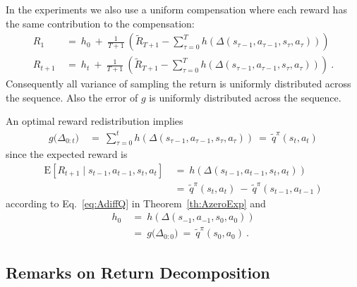 \documentclass{article}
\newcommand\EXP{\mathbf{\mathrm{E}}}
\begin{document}
\begin{appendices}
In the experiments we also use a uniform compensation 
where each reward has the same
contribution to the compensation:
\begin{align}
  R_1 \ &= \ h_0 \ + \
 \frac{1}{T+1}  \
 \left(\tilde{R}_{T+1} - \sum_{\tau=0}^T
 h(\Delta(s_{\tau-1},a_{\tau-1},s_{\tau},a_{\tau})) \right) \\
  R_{t+1} \ &= \ h_t \ + \
  \frac{1}{T+1}  \
 \left(\tilde{R}_{T+1} - 
  \sum_{\tau=0}^T h(\Delta(s_{\tau-1},a_{\tau-1},s_{\tau},a_{\tau})) \right) \ .
\end{align}
Consequently all variance of sampling the return is 
uniformly distributed across
the sequence. Also the error of $g$ is uniformly distributed 
across the sequence.

An optimal reward redistribution implies
\begin{align}
  \label{eq:part}
  g\big(\Delta_{0:t}\big) \ &= \
  \sum_{\tau=0}^t  h(\Delta(s_{\tau-1},a_{\tau-1},s_{\tau},a_{\tau}))
  \ = \ \tilde{q}^\pi(s_t,a_t) 
\end{align} 
since the expected reward is
\begin{align}
   \EXP \left[ R_{t+1} \mid s_{t-1},a_{t-1},s_t,a_t \right] \ &= \
   h(\Delta(s_{t-1},a_{t-1},s_t,a_t)) \\ \nonumber
  &= \ \tilde{q}^\pi(s_t,a_t) \ - \  \tilde{q}^\pi(s_{t-1},a_{t-1}) 
\end{align} 
according to Eq.~\eqref{eq:AdiffQ} in Theorem~\ref{th:AzeroExp}
and 
\begin{align}
 h_0 \ &= \ h(\Delta(s_{-1},a_{-1},s_0,a_0) ) \\ \nonumber
 &= \ g\big(\Delta_{0:0}\big) \ = \ \tilde{q}^\pi(s_0,a_0) \ .
\end{align} 




\subsection{Remarks on Return Decomposition}
\label{sec:Aremark}


\end{appendices}
\end{document}
